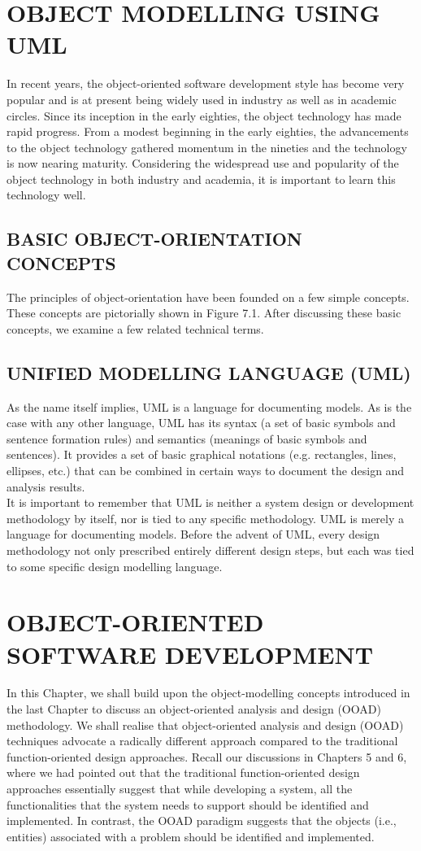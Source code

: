 \documentclass[12pt]{article}
\begin{document}
\section{OBJECT MODELLING USING UML}
In recent years, the object-oriented software development style has
become very popular and is at present being widely used in industry as
well as in academic circles. Since its inception in the early eighties, the
object technology has made rapid progress. From a modest beginning in
the early eighties, the advancements to the object technology gathered
momentum in the nineties and the technology is now nearing maturity.
Considering the widespread use and popularity of the object technology
in both industry and academia, it is important to learn this technology
well.

\subsection{BASIC OBJECT-ORIENTATION CONCEPTS}
The principles of object-orientation have been founded on a few simple
concepts. These concepts are pictorially shown in Figure 7.1. After discussing
these basic concepts, we examine a few related technical terms.
\subsection{UNIFIED MODELLING LANGUAGE (UML)}
As the name itself implies, UML is a language for documenting models.
As is the case with any other language, UML has its syntax (a set of
basic symbols and sentence formation rules) and semantics (meanings
of basic symbols and sentences). It provides a set of basic graphical
notations (e.g. rectangles, lines, ellipses, etc.) that can be combined in
certain ways to document the design and analysis results.\\

It is important to remember that UML is neither a system design or
development methodology by itself, nor is tied to any specific methodology.
UML is merely a language for documenting models. Before the advent of UML,
every design methodology not only prescribed entirely different design steps,
but each was tied to some specific design modelling language. 
\pagebreak

\section{OBJECT-ORIENTED SOFTWARE DEVELOPMENT}
In this Chapter, we shall build upon the object-modelling concepts
introduced in the last Chapter to discuss an object-oriented analysis and
design (OOAD) methodology. We shall realise that object-oriented
analysis and design (OOAD) techniques advocate a radically different
approach compared to the traditional function-oriented design
approaches. Recall our discussions in Chapters 5 and 6, where we had
pointed out that the traditional function-oriented design approaches
essentially suggest that while developing a system, all the
functionalities that the system needs to support should be identified
and implemented. In contrast, the OOAD paradigm suggests that the
objects (i.e., entities) associated with a problem should be identified
and implemented.
\end{document}
